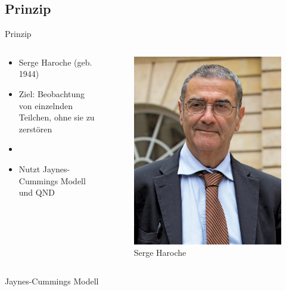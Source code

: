 \documentclass{beamer}
\begin{document}
\subsection{Prinzip}
\begin{frame}{Prinzip}
	\begin{columns}
		\begin{column}{0.5\textwidth}
			\begin{itemize}
				\item Serge Haroche (geb. 1944)
				\item Ziel: Beobachtung von einzelnden Teilchen, ohne sie zu zerstören
				\item
				\item Nutzt Jaynes-Cummings Modell und QND
			\end{itemize}
		\end{column}
		\begin{column}{0.5\textwidth}
			\begin{figure}
				\center\includegraphics[width=.8\textwidth]{images/haroche.jpg}
				\caption{Serge Haroche\cite{brit}}
			\end{figure}
		\end{column}
	\end{columns}
\end{frame}
\begin{frame}{Jaynes-Cummings Modell}
\end{frame}
\end{document}
